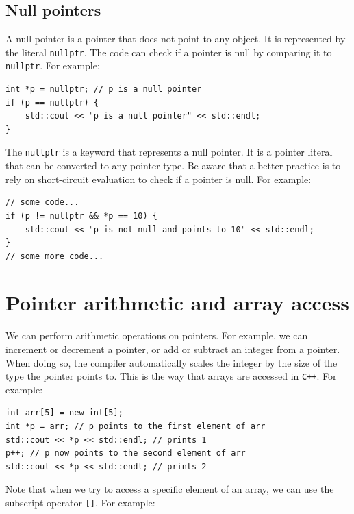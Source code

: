 \subsection{Null pointers}

A null pointer is a pointer that does not point to any object. It is represented by the literal \texttt{nullptr}.
The code can check if a pointer is null by comparing it to \texttt{nullptr}. For example:\\

\begin{lstlisting}
int *p = nullptr; // p is a null pointer
if (p == nullptr) {
    std::cout << "p is a null pointer" << std::endl;
}
\end{lstlisting}

The \texttt{nullptr} is a keyword that represents a null pointer. It is a pointer literal that can be converted to any pointer type.
Be aware that a better practice is to rely on short-circuit evaluation to check if a pointer is null. For example:\\

\begin{lstlisting}
// some code...
if (p != nullptr && *p == 10) {
    std::cout << "p is not null and points to 10" << std::endl;
}
// some more code...
\end{lstlisting}

\section{Pointer arithmetic and array access}

We can perform arithmetic operations on pointers. For example, we can increment or decrement a pointer, or add or subtract an integer
from a pointer. When doing so, the compiler automatically scales the integer by the size of the type the pointer points to. This is the 
way that arrays are accessed in \texttt{C++}. For example:\\

\begin{lstlisting}
int arr[5] = new int[5];
int *p = arr; // p points to the first element of arr
std::cout << *p << std::endl; // prints 1
p++; // p now points to the second element of arr
std::cout << *p << std::endl; // prints 2
\end{lstlisting}

Note that when we try to access a specific element of an array, we can use the subscript operator \texttt{[]}. For example:\\

